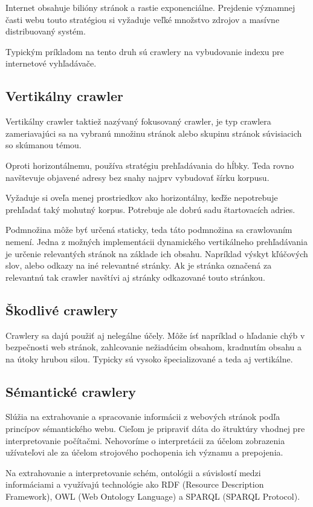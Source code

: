 Internet obsahuje bilióny stránok a rastie exponenciálne. Prejdenie významnej časti webu touto stratégiou si vyžaduje veľké množstvo zdrojov a masívne distribuovaný systém. 

Typickým príkladom na tento druh sú crawlery na vybudovanie indexu pre internetové vyhľadávače.

\subsection{Vertikálny crawler}
Vertikálny crawler taktiež nazývaný fokusovaný crawler, je typ crawlera zameriavajúci sa na vybranú množinu stránok alebo skupinu stránok súvisiacich so skúmanou témou.

Oproti horizontálnemu, používa stratégiu prehľadávania do hĺbky. Teda rovno navštevuje objavené adresy bez snahy najprv vybudovať šírku korpusu. 

Vyžaduje si oveľa menej prostriedkov ako horizontálny, keďže nepotrebuje prehľadať taký mohutný korpus. Potrebuje ale dobrú sadu štartovacích adries.

Podmnožina môže byť určená staticky, teda táto podmnožina sa crawlovaním nemení. Jedna z možných implementácii dynamického vertikálneho prehľadávania je určenie relevantých stránok na základe ich obsahu. Napríklad výskyt kľúčových slov, alebo odkazy na iné relevantné stránky. Ak je stránka označená za relevantnú tak crawler navštívi aj stránky odkazované touto stránkou. 

\subsection{Škodlivé crawlery}
Crawlery sa dajú použiť aj nelegálne účely. Môže ísť napríklad o hľadanie chýb v bezpečnosti web stránok, zahlcovanie nežiadúcim obsahom, kradnutím obsahu a na útoky hrubou silou. Typicky sú vysoko špecializované a teda aj vertikálne. 


\subsection{Sémantické crawlery}
Slúžia na extrahovanie a spracovanie informácii z webových stránok podľa princípov sémantického webu. Cieľom je pripraviť dáta do štruktúry vhodnej pre interpretovanie počítačmi. Nehovoríme o interpretácii za účelom zobrazenia užívateľovi ale za účelom strojového pochopenia ich významu a prepojenia. \cite{semanticWeb}

Na extrahovanie a interpretovanie schém, ontológii a  súvislostí medzi informáciami a využívajú technológie ako RDF (Resource Description Framework), OWL (Web Ontology Language) a SPARQL (SPARQL Protocol)\cite{ontologies}.

